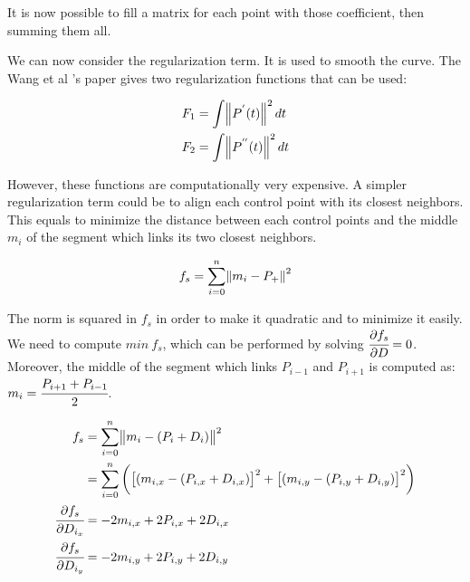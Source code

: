 \documentclass{article}
\newcommand{\vsp}{\vspace{\baselineskip}}
\begin{document}
It is now possible to fill a matrix for each point with those coefficient, then summing them all.

\vsp

We can now consider the regularization term. It is used to smooth the curve. The Wang et al 's paper \cite{SDM_bspline_fitting} gives two regularization functions that can be used:

\begin{equation}
    \begin{aligned}
        F_1 &= \int \norm{P^{'}(t)}^2 dt \\
        F_2 &= \int \norm{P^{''}(t)}^2 dt \\
    \end{aligned}    
\end{equation}

However, these functions are computationally very expensive. A simpler regularization term could be to align each control point with its closest neighbors. This equals to minimize the distance between each control points and the middle $m_i$ of the segment which links its two closest neighbors.

\vsp

\begin{equation}
    f_s = \sum \limits_{i=0}^{n} \norm{m_i - P_+}^2
\end{equation}

The norm is squared in $f_s$ in order to make it quadratic and to minimize it easily. We need to compute $min\ f_s$, which can be performed by solving $\cfrac{\partial f_s}{\partial D} = 0$. Moreover, the middle of the segment which links $P_{i-1}$ and $P_{i+1}$ is computed as: $m_i = \cfrac{P_{i+1} + P_{i-1}}{2}$.

\begin{equation}
\label{eq:reg_derivative}
    \begin{aligned}
        f_s &= \sum \limits_{i=0}^{n} \norm{m_i - (P_i+D_i)}^2
        \\
            &= \sum \limits_{i=0}^{n} 
            \bigg( \big[ (m_{i,x} - (P_{i,x}+D_{i,x})\big]^2 
            + \big[ (m_{i,y} - (P_{i,y}+D_{i,y})\big]^2 \bigg)
        \\
        \cfrac{\partial f_s}{\partial D_{i_x}} &= -2 m_{i,x} + 2 P_{i,x} + 2 D_{i,x}
        \\
        \cfrac{\partial f_s}{\partial D_{i_y}} &= -2 m_{i,y} + 2 P_{i,y} + 2 D_{i,y}
    \end{aligned}
\end{equation}
\end{document}
